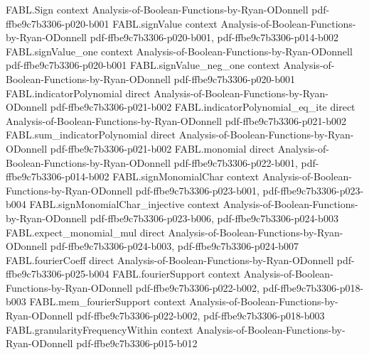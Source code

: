 \begin{theorem}
\label{FABL.deriv_noiseSensitivityCurve_zero}
\leanok
{}
\proofstep
  {FABL.Sign}
  {context}
  {Analysis-of-Boolean-Functions-by-Ryan-ODonnell}
  {pdf-ffbe9c7b3306-p020-b001}
\proofstep
  {FABL.signValue}
  {context}
  {Analysis-of-Boolean-Functions-by-Ryan-ODonnell}
  {pdf-ffbe9c7b3306-p020-b001,
    pdf-ffbe9c7b3306-p014-b002}
\proofstep
  {FABL.signValue_one}
  {context}
  {Analysis-of-Boolean-Functions-by-Ryan-ODonnell}
  {pdf-ffbe9c7b3306-p020-b001}
\proofstep
  {FABL.signValue_neg_one}
  {context}
  {Analysis-of-Boolean-Functions-by-Ryan-ODonnell}
  {pdf-ffbe9c7b3306-p020-b001}
\proofstep
  {FABL.indicatorPolynomial}
  {direct}
  {Analysis-of-Boolean-Functions-by-Ryan-ODonnell}
  {pdf-ffbe9c7b3306-p021-b002}
\proofstep
  {FABL.indicatorPolynomial_eq_ite}
  {direct}
  {Analysis-of-Boolean-Functions-by-Ryan-ODonnell}
  {pdf-ffbe9c7b3306-p021-b002}
\proofstep
  {FABL.sum_indicatorPolynomial}
  {direct}
  {Analysis-of-Boolean-Functions-by-Ryan-ODonnell}
  {pdf-ffbe9c7b3306-p021-b002}
\proofstep
  {FABL.monomial}
  {direct}
  {Analysis-of-Boolean-Functions-by-Ryan-ODonnell}
  {pdf-ffbe9c7b3306-p022-b001,
    pdf-ffbe9c7b3306-p014-b002}
\proofstep
  {FABL.signMonomialChar}
  {context}
  {Analysis-of-Boolean-Functions-by-Ryan-ODonnell}
  {pdf-ffbe9c7b3306-p023-b001,
    pdf-ffbe9c7b3306-p023-b004}
\proofstep
  {FABL.signMonomialChar_injective}
  {context}
  {Analysis-of-Boolean-Functions-by-Ryan-ODonnell}
  {pdf-ffbe9c7b3306-p023-b006,
    pdf-ffbe9c7b3306-p024-b003}
\proofstep
  {FABL.expect_monomial_mul}
  {direct}
  {Analysis-of-Boolean-Functions-by-Ryan-ODonnell}
  {pdf-ffbe9c7b3306-p024-b003,
    pdf-ffbe9c7b3306-p024-b007}
\proofstep
  {FABL.fourierCoeff}
  {direct}
  {Analysis-of-Boolean-Functions-by-Ryan-ODonnell}
  {pdf-ffbe9c7b3306-p025-b004}
\proofstep
  {FABL.fourierSupport}
  {context}
  {Analysis-of-Boolean-Functions-by-Ryan-ODonnell}
  {pdf-ffbe9c7b3306-p022-b002,
    pdf-ffbe9c7b3306-p018-b003}
\proofstep
  {FABL.mem_fourierSupport}
  {context}
  {Analysis-of-Boolean-Functions-by-Ryan-ODonnell}
  {pdf-ffbe9c7b3306-p022-b002,
    pdf-ffbe9c7b3306-p018-b003}
\proofstep
  {FABL.granularityFrequencyWithin}
  {context}
  {Analysis-of-Boolean-Functions-by-Ryan-ODonnell}
  {pdf-ffbe9c7b3306-p015-b012}

\end{theorem}
